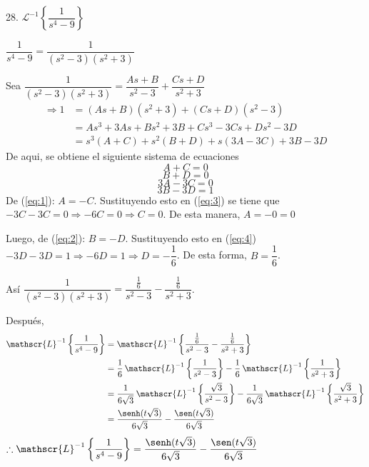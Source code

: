 \documentclass[fleqn]{article}
\begin{document}
    28. $ \mathscr{L}^{-1} \left\lbrace \dfrac{1}{s^4 - 9} \right\rbrace $

    $ \dfrac{1}{s^4 - 9} = \dfrac{1}{(s^2 - 3)(s^2 + 3)} $

    Sea $ \dfrac{1}{(s^2 - 3)(s^2 + 3)} = \dfrac{As + B}{s^2 - 3} + \dfrac{Cs + D}{s^2 + 3} $
    \begin{align*}
        \Longrightarrow 1 &= (As + B)(s^2 + 3) + (Cs + D)(s^2 - 3) \\
        &= As^3 + 3As + Bs^2 + 3B + Cs^3 - 3Cs + Ds^2 - 3D \\
        &= s^3(A + C) + s^2(B + D) + s(3A - 3C) + 3B - 3D
    \end{align*}
    De aqui, se obtiene el siguiente sistema de ecuaciones
    \begin{equation}
        A + C = 0 
        \label{eq:1}
    \end{equation}
    \begin{equation}
        B + D = 0 
        \label{eq:2}
    \end{equation}
    \begin{equation}
        3A - 3C = 0 
        \label{eq:3}
    \end{equation}
    \begin{equation}
        3B - 3D = 1
        \label{eq:4}
    \end{equation}
    De (\ref{eq:1}): $ A = -C $. Sustituyendo esto en (\ref{eq:3}) se tiene que $ -3C - 3C = 0 \Longrightarrow -6C = 0 \Longrightarrow C = 0 $. De esta manera, $ A = -0 = 0 $

    Luego, de (\ref{eq:2}): $ B = -D $. Sustituyendo esto en (\ref{eq:4}) $ -3D - 3D = 1 \Longrightarrow -6D = 1 \Longrightarrow D = - \dfrac{1}{6} $. De esta forma, $ B = \dfrac{1}{6} $.

    Así $ \dfrac{1}{(s^2 - 3)(s^2 + 3)} = \dfrac{\frac{1}{6}}{s^2 - 3} - \dfrac{\frac{1}{6}}{s^2 + 3} $.

    Después, 
    \begin{align*}
        \mathscr{L}^{-1} \left\lbrace \dfrac{1}{s^4 - 9} \right\rbrace &= \mathscr{L}^{-1} \left\lbrace \dfrac{\frac{1}{6}}{s^2 - 3} - \dfrac{\frac{1}{6}}{s^2 + 3} \right\rbrace \\
        &= \dfrac{1}{6} \, \mathscr{L}^{-1} \left\lbrace \dfrac{1}{s^2 - 3} \right\rbrace - \dfrac{1}{6} \, \mathscr{L}^{-1} \left\lbrace \dfrac{1}{s^2 + 3} \right\rbrace \\
        &= \dfrac{1}{6 \sqrt{3}} \, \mathscr{L}^{-1} \left\lbrace \dfrac{\sqrt{3}}{s^2 - 3} \right\rbrace - \dfrac{1}{6 \sqrt{3}} \, \mathscr{L}^{-1} \left\lbrace \dfrac{\sqrt{3}}{s^2 + 3} \right\rbrace \\
        &= \dfrac{\senh (t \sqrt{3})}{6 \sqrt{3}} - \dfrac{\sen (t \sqrt{3})}{6 \sqrt{3}}
    \end{align*}
    $ \therefore \mathscr{L}^{-1} \left\lbrace \dfrac{1}{s^4 - 9} \right\rbrace = \dfrac{\senh (t \sqrt{3})}{6 \sqrt{3}} - \dfrac{\sen (t \sqrt{3})}{6 \sqrt{3}} $
\end{document}
